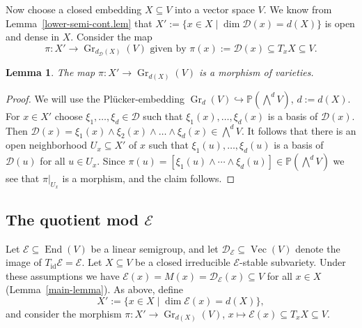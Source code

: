 \documentclass{amsart}
\newtheorem{lem}[thm]{Lemma}
\theoremstyle{definition}
\theoremstyle{remark}
\begin{document}
Now  choose a closed embedding $X{\subseteq} V$ into a vector space $V$. We know from Lemma~\ref{lower-semi-cont.lem} that $X':=\{x\in X \mid \dim {\mathcal D}(x)=d(X)\}$ is open and dense in $X$. Consider the map 
$$
\pi\colon X' \to \operatorname{Gr}_{d_{\mathcal D}(X)}(V) \text{ given by }\pi(x) := {\mathcal D}(x){\subseteq} T_{x}X {\subseteq} V.
$$
\begin{lem}
The map $\pi\colon X' \to \operatorname{Gr}_{d(X)}(V)$ is a morphism of varieties.
\end{lem}
\begin{proof}
We will use the Pl\"ucker-embedding $\operatorname{Gr}_{d}(V) {\hookrightarrow} {\mathbb P}(\bigwedge^{d}V)$, $d := d(X)$. For  $x \in X'$ choose $\xi_{1},\ldots,\xi_{d} \in {\mathcal D}$ such that $\xi_{1}(x),\ldots,\xi_{d}(x)$ is a basis of ${\mathcal D}(x)$. Then ${\mathcal D}(x)= \xi_{1}(x)\wedge \xi_{2}(x)\wedge\dots\wedge\xi_{d}(x)\in\bigwedge^{d}V$. It follows that  there is an open neighborhood $U_{x}{\subseteq} X'$ of $x$ such that $\xi_{1}(u),\ldots,\xi_{d}(u)$ is a basis of ${\mathcal D}(u)$ for all $u \in U_{x}$. Since $\pi(u) = [\xi_{1}(u)\wedge\cdots\wedge\xi_{d}(u)] \in {\mathbb P}(\bigwedge^{d}V)$ we see that $\pi|_{U_{x}}$ is a morphism, and  the claim follows.
\end{proof}

{\par\smallskip}
\subsection{The quotient mod ${\mathcal E}$}
Let ${\mathcal E} {\subseteq} \operatorname{End}(V)$ be a linear semigroup, and let ${\mathcal D}_{\mathcal E} {\subseteq} \operatorname{Vec}(V)$ denote the image of $T_\operatorname{id}{\mathcal E} = {\mathcal E}$. 
Let $X {\subseteq} V$ be a closed irreducible ${\mathcal E}$-stable subvariety.
Under these assumptions we have ${\mathcal E}(x)=M(x)={\mathcal D}_{\mathcal E}(x) {\subseteq} V$  for all $x \in X$ (Lemma~\ref{main-lemma}).
As above, define 
$$
X':=\{x\in X\mid \dim {\mathcal E}(x) = d(X)\},
$$
and consider the morphism  $\pi\colon X' \to \operatorname{Gr}_{d(X)}(V)$, $x\mapsto {\mathcal E}(x){\subseteq} T_{x}X {\subseteq} V$.
\end{document}
